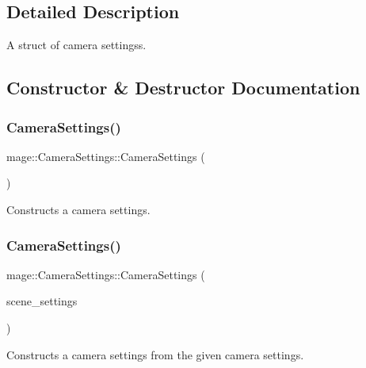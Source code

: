 \subsection{Detailed Description}
A struct of camera settingss. 

\subsection{Constructor \& Destructor Documentation}
\hypertarget{structmage_1_1_camera_settings_a08e24d87d4441af780a3f34504a41118}{}\label{structmage_1_1_camera_settings_a08e24d87d4441af780a3f34504a41118} 
\subsubsection{\texorpdfstring{Camera\+Settings()}{CameraSettings()}\hspace{0.1cm}{\footnotesize\ttfamily [1/3]}}
{\footnotesize\ttfamily mage\+::\+Camera\+Settings\+::\+Camera\+Settings (\begin{DoxyParamCaption}{ }\end{DoxyParamCaption})}

Constructs a camera settings. \hypertarget{structmage_1_1_camera_settings_a9dc529822866523b62b7d9388e04c5fd}{}\label{structmage_1_1_camera_settings_a9dc529822866523b62b7d9388e04c5fd} 
\subsubsection{\texorpdfstring{Camera\+Settings()}{CameraSettings()}\hspace{0.1cm}{\footnotesize\ttfamily [2/3]}}
{\footnotesize\ttfamily mage\+::\+Camera\+Settings\+::\+Camera\+Settings (\begin{DoxyParamCaption}\item[{const \hyperlink{structmage_1_1_camera_settings}{Camera\+Settings} \&}]{scene\+\_\+settings }\end{DoxyParamCaption})\hspace{0.3cm}{\ttfamily [default]}}

Constructs a camera settings from the given camera settings.


